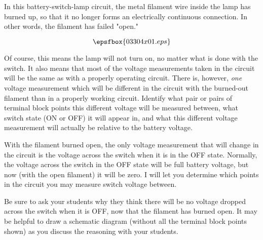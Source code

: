 

In this battery-switch-lamp circuit, the metal filament wire inside the lamp has burned up, so that it no longer forms an electrically continuous connection.  In other words, the filament has failed "open."

$$\epsfbox{03304x01.eps}$$

Of course, this means the lamp will not turn on, no matter what is done with the switch.  It also means that most of the voltage measurements taken in the circuit will be the same as with a properly operating circuit.  There is, however, {\it one} voltage measurement which will be different in the circuit with the burned-out filament than in a properly working circuit.  Identify what pair or pairs of terminal block points this different voltage will be measured between, what switch state (ON or OFF) it will appear in, and what this different voltage measurement will actually be relative to the battery voltage.







With the filament burned open, the only voltage measurement that will change in the circuit is the voltage across the switch when it is in the OFF state.  Normally, the voltage across the switch in the OFF state will be full battery voltage, but now (with the open filament) it will be zero.  I will let you determine which points in the circuit you may measure switch voltage between.







Be sure to ask your students why they think there will be no voltage dropped across the switch when it is OFF, now that the filament has burned open.  It may be helpful to draw a schematic diagram (without all the terminal block points shown) as you discuss the reasoning with your students.




